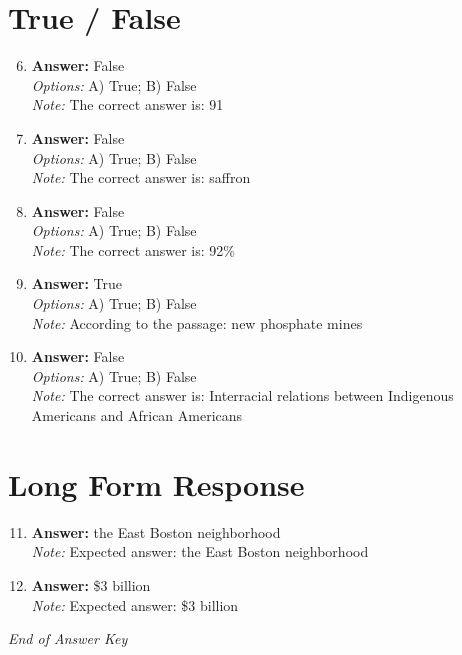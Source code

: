 \documentclass[12pt]{article}
\begin{document}
\section*{True / False}
\begin{enumerate}[label=\arabic*.]
\setcounter{enumi}{5}
\item \textbf{Answer:} False
\\ \textit{Options:} A) True; B) False
\\ \textit{Note:} The correct answer is: 91
\item \textbf{Answer:} False
\\ \textit{Options:} A) True; B) False
\\ \textit{Note:} The correct answer is: saffron
\item \textbf{Answer:} False
\\ \textit{Options:} A) True; B) False
\\ \textit{Note:} The correct answer is: 92\%
\item \textbf{Answer:} True
\\ \textit{Options:} A) True; B) False
\\ \textit{Note:} According to the passage: new phosphate mines
\item \textbf{Answer:} False
\\ \textit{Options:} A) True; B) False
\\ \textit{Note:} The correct answer is: Interracial relations between Indigenous Americans and African Americans
\end{enumerate}

\section*{Long Form Response}
\begin{enumerate}[label=\arabic*.]
\setcounter{enumi}{10}
\item \textbf{Answer:} the East Boston neighborhood
\\ \textit{Note:} Expected answer: the East Boston neighborhood
\item \textbf{Answer:} \$3 billion
\\ \textit{Note:} Expected answer: \$3 billion
\end{enumerate}

\vfill
\noindent\textit{End of Answer Key}
\end{document}
